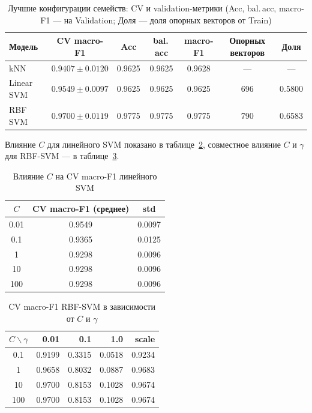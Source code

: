 \documentclass[14pt,a4paper]{extarticle}
\newcommand{\sd}{\ensuremath{\pm}}
\begin{document}
\begin{table}[h!]
\centering
\footnotesize\setlength{\tabcolsep}{3pt}
\begin{tabular}{lcccccc}
\toprule
Модель & CV macro-F1 & Acc & bal.\,acc & macro-F1 & Опорных векторов & Доля \\
\midrule
kNN & $0.9407\sd 0.0120$ & 0.9625 & 0.9625 & 0.9628 & --- & --- \\
Linear SVM & $0.9549\sd 0.0097$ & 0.9625 & 0.9625 & 0.9625 & 696 & 0.5800 \\
RBF SVM & $0.9700\sd 0.0119$ & 0.9775 & 0.9775 & 0.9775 & 790 & 0.6583 \\
\bottomrule
\end{tabular}
\caption{Лучшие конфигурации семейств: CV и validation-метрики (Acc, bal.\,acc, macro-F1 --- на Validation; Доля --- доля опорных векторов от Train)}
\label{tab:svm}
\end{table}

Влияние $C$ для линейного SVM показано в таблице~\ref{tab:lin}, совместное влияние $C$ и $\gamma$ для RBF-SVM --- в таблице~\ref{tab:rbf}.

\begin{table}[h!]
\centering
\begin{tabular}{ccc}
\toprule
$C$ & CV macro-F1 (среднее) & std \\
\midrule
0.01 & 0.9549 & 0.0097 \\
0.1  & 0.9365 & 0.0125 \\
1    & 0.9298 & 0.0096 \\
10   & 0.9298 & 0.0096 \\
100  & 0.9298 & 0.0096 \\
\bottomrule
\end{tabular}
\caption{Влияние $C$ на CV macro-F1 линейного SVM}
\label{tab:lin}
\end{table}

\begin{table}[h!]
\centering
\begin{tabular}{crrrr}
\toprule
$C \backslash \gamma$ & 0.01 & 0.1 & 1.0 & scale \\
\midrule
0.1  & 0.9199 & 0.3315 & 0.0518 & 0.9234 \\
1    & 0.9658 & 0.8032 & 0.0887 & 0.9683 \\
10   & 0.9700 & 0.8153 & 0.1028 & 0.9674 \\
100  & 0.9700 & 0.8153 & 0.1028 & 0.9674 \\
\bottomrule
\end{tabular}
\caption{CV macro-F1 RBF-SVM в зависимости от $C$ и $\gamma$}
\label{tab:rbf}
\end{table}
\end{document}
